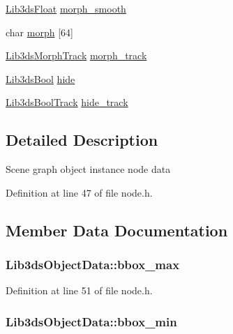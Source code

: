 \begin{DoxyCompactItemize}
\item 
\hyperlink{types_8h_ab18e70f51f9a53c9dee8d930c8e1a7bf}{Lib3ds\-Float} \hyperlink{struct_lib3ds_object_data_ad1bfb517e5f8fc4ba4f9e2aec521683d}{morph\-\_\-smooth}
\item 
char \hyperlink{struct_lib3ds_object_data_ab75f8de80a09fcdcf77f71341be6030a}{morph} \mbox{[}64\mbox{]}
\item 
\hyperlink{struct_lib3ds_morph_track}{Lib3ds\-Morph\-Track} \hyperlink{struct_lib3ds_object_data_a46745aa4e6ad1bb14f43eaab8bba72e3}{morph\-\_\-track}
\item 
\hyperlink{types_8h_a89dd7398a9ebbbf28011f8c32df67ad3}{Lib3ds\-Bool} \hyperlink{struct_lib3ds_object_data_a9d44dcb8dd989e6c235061834a88c8fb}{hide}
\item 
\hyperlink{struct_lib3ds_bool_track}{Lib3ds\-Bool\-Track} \hyperlink{struct_lib3ds_object_data_af9fd4cb9c02ec3c44ba353e98892f383}{hide\-\_\-track}
\end{DoxyCompactItemize}


\subsection{Detailed Description}
Scene graph object instance node data 

Definition at line 47 of file node.\-h.



\subsection{Member Data Documentation}
\hypertarget{struct_lib3ds_object_data_a453c960ee983570948d990ee303524b4}{
\subsubsection[{bbox\-\_\-max}]{ Lib3ds\-Object\-Data\-::bbox\-\_\-max}}\label{struct_lib3ds_object_data_a453c960ee983570948d990ee303524b4}


Definition at line 51 of file node.\-h.

\hypertarget{struct_lib3ds_object_data_a6d60fc5846deefb4ff36bca9b5fbf2a9}{
\subsubsection[{bbox\-\_\-min}]{ Lib3ds\-Object\-Data\-::bbox\-\_\-min}}\label{struct_lib3ds_object_data_a6d60fc5846deefb4ff36bca9b5fbf2a9}


